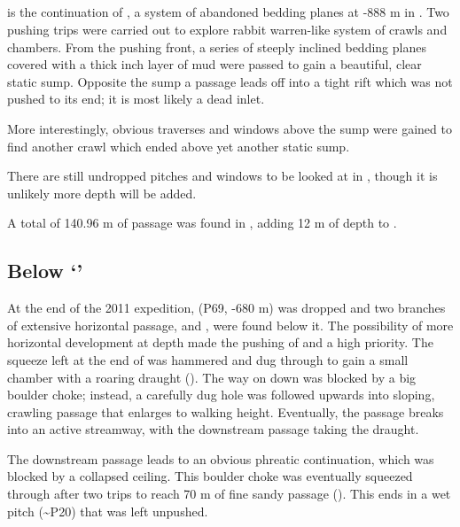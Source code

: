 \subsection{\texorpdfstring{}{Watership Down}}

 is the continuation of , a
system of abandoned bedding planes at -888 m in . Two
pushing trips were carried out to explore rabbit warren-like system of
crawls and chambers. From the  pushing front, a
series of steeply inclined bedding planes covered with a thick inch
layer of mud were passed to gain a beautiful, clear static sump.
Opposite the sump a passage leads off into a tight rift which was not
pushed to its end; it is most likely a dead inlet.

More interestingly, obvious traverses and windows above the sump were
gained to find another crawl which ended above yet another static sump.

There are still undropped pitches and windows to be looked at in
, though it is unlikely more depth will be added.

A total of 140.96 m of passage was found in ,
adding 12 m of depth to .


\subsection{\texorpdfstring{Below `'}{Below `Stuck in Paradise'}}

At the end of the 2011 expedition,  (P69, -680
m) was dropped and two branches of extensive horizontal passage,
 and , were found below it. The
possibility of more horizontal development at depth made the pushing of
 and  a high priority. 
The squeeze left at the end of  was hammered and dug
through to gain a small chamber with a roaring draught (). The way on down was blocked by a big boulder choke; instead, a
carefully dug hole was followed upwards into sloping, crawling passage
that enlarges to walking height. Eventually, the passage breaks into an
active streamway, with the downstream passage taking the draught.

The downstream passage leads to an obvious phreatic continuation, which
was blocked by a collapsed ceiling. This boulder choke was eventually
squeezed through after two trips to reach 70 m of fine sandy passage
(). This ends in a wet pitch (\textasciitilde P20) that
was left unpushed.

